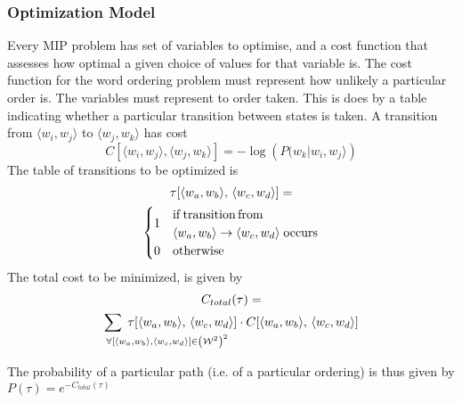 \documentclass[twocolumn]{article}
\begin{document}
\subsubsection{Optimization Model}
Every MIP problem has set of variables to optimise, and a cost function that assesses how optimal a given choice of values for that variable is. The cost function for the word ordering problem must represent how unlikely a particular order is. The variables must represent to order taken. This is does by a table indicating whether a particular transition between states is taken.
%
A transition from $\langle w_{i},w_{j}\rangle$ to $\langle w_{j},w_{k}\rangle$
 has cost \begin{equation*}
	C[\langle w_{i},w_{j}\rangle,\langle w_{j},w_{k}\rangle]=-\log\left(P(w_{k}|w_{i},w_{j}\rangle\right)
\end{equation*} 
%
The table of transitions to be optimized is 
\displayunskip
\begin{multline*}
 \tau[\langle w_{a},w_{b}\rangle,\,\langle w_{c},w_{d}\rangle] = \\
 \begin{cases}
	 \multirow{2}{*}{1} & \mathrm{if\,transition\,from} \\
	 	                & \langle w_{a},w_{b}\rangle \to \langle w_{c},w_{d}\rangle
	 	                   \;\mathrm{ occurs} \\
                     0  & \mathrm{otherwise}
  \end{cases}
\end{multline*}
%
The total cost to be minimized, is given by
\displayunskip
\begin{multline*}
 C_{total}(\tau)= \\
	 \sum_{\mathrlap{\!\!\!\!\forall\left[\langle w_{a},w_{b}\rangle,\langle w_{c},w_{d}\rangle\right]\in\left(\W^{2}\right)^{2}
 	}}
 	\;\tau[\langle w_{a},w_{b}\rangle,\,\langle w_{c},w_{d}\rangle] \cdot C[\langle w_{a},w_{b}\rangle,\,\langle w_{c},w_{d}\rangle]
\end{multline*}

\begin{comment}
\begin{multline*}
C_{total}(\tau)= 
\sum_{\mathclap{
		\left[w_{ab},w_{cd}\right]\in\left(\W^{2}\right)^{2}
	}}
	\;\tau[w_{ab},w_{cd}] \cdot C[w_{ab},w_{cd}]
\end{multline*}
\end{comment}
%
The probability of a particular path (i.e. of a particular ordering)
is thus given by $P(\tau)=e^{-C_{total}(\tau)}$
\end{document}
